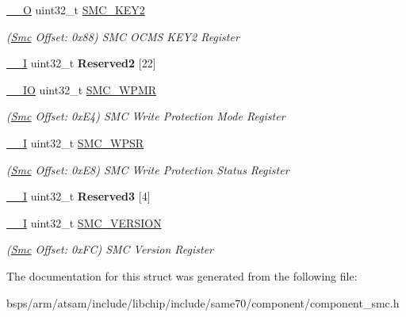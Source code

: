 \begin{DoxyCompactItemize}
\mbox{\label{structSmc_a2eb3bbf5d49b0c04da8f55d78226a2cd}} 
\mbox{\hyperlink{core__cm7_8h_a7e25d9380f9ef903923964322e71f2f6}{\+\_\+\+\_\+O}} uint32\+\_\+t \mbox{\hyperlink{structSmc_a2eb3bbf5d49b0c04da8f55d78226a2cd}{S\+M\+C\+\_\+\+K\+E\+Y2}}
\begin{DoxyCompactList}\small\item\em (\mbox{\hyperlink{structSmc}{Smc}} Offset\+: 0x88) S\+MC O\+C\+MS K\+E\+Y2 Register \end{DoxyCompactList}\item 
\mbox{\label{structSmc_a84e5d2113b87ddf978afaf4a6a8d8e79}} 
\mbox{\hyperlink{core__cm7_8h_af63697ed9952cc71e1225efe205f6cd3}{\+\_\+\+\_\+I}} uint32\+\_\+t {\bfseries Reserved2} \mbox{[}22\mbox{]}
\item 
\mbox{\label{structSmc_a24092bb31ddc14f547466123b4be1491}} 
\mbox{\hyperlink{core__cm7_8h_aec43007d9998a0a0e01faede4133d6be}{\+\_\+\+\_\+\+IO}} uint32\+\_\+t \mbox{\hyperlink{structSmc_a24092bb31ddc14f547466123b4be1491}{S\+M\+C\+\_\+\+W\+P\+MR}}
\begin{DoxyCompactList}\small\item\em (\mbox{\hyperlink{structSmc}{Smc}} Offset\+: 0x\+E4) S\+MC Write Protection Mode Register \end{DoxyCompactList}\item 
\mbox{\label{structSmc_a5a966b80123a48e786f00b8309a8b315}} 
\mbox{\hyperlink{core__cm7_8h_af63697ed9952cc71e1225efe205f6cd3}{\+\_\+\+\_\+I}} uint32\+\_\+t \mbox{\hyperlink{structSmc_a5a966b80123a48e786f00b8309a8b315}{S\+M\+C\+\_\+\+W\+P\+SR}}
\begin{DoxyCompactList}\small\item\em (\mbox{\hyperlink{structSmc}{Smc}} Offset\+: 0x\+E8) S\+MC Write Protection Status Register \end{DoxyCompactList}\item 
\mbox{\label{structSmc_ad924accf6f73dc12a49a27eb2d7d6ab9}} 
\mbox{\hyperlink{core__cm7_8h_af63697ed9952cc71e1225efe205f6cd3}{\+\_\+\+\_\+I}} uint32\+\_\+t {\bfseries Reserved3} \mbox{[}4\mbox{]}
\item 
\mbox{\label{structSmc_af59de21e49816747db4a7c5528773577}} 
\mbox{\hyperlink{core__cm7_8h_af63697ed9952cc71e1225efe205f6cd3}{\+\_\+\+\_\+I}} uint32\+\_\+t \mbox{\hyperlink{structSmc_af59de21e49816747db4a7c5528773577}{S\+M\+C\+\_\+\+V\+E\+R\+S\+I\+ON}}
\begin{DoxyCompactList}\small\item\em (\mbox{\hyperlink{structSmc}{Smc}} Offset\+: 0x\+FC) S\+MC Version Register \end{DoxyCompactList}\end{DoxyCompactItemize}


The documentation for this struct was generated from the following file\+:\begin{DoxyCompactItemize}
\item 
bsps/arm/atsam/include/libchip/include/same70/component/component\+\_\+smc.\+h\end{DoxyCompactItemize}
